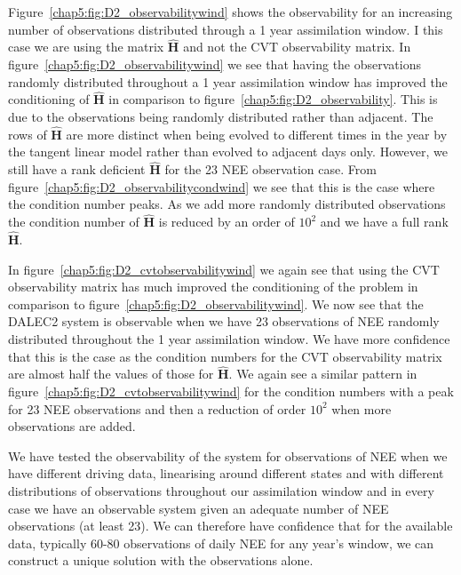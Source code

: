 Figure~\ref{chap5:fig:D2_observabilitywind} shows the observability for an increasing number of observations distributed through a 1 year assimilation window. I this case we are using the matrix $\hat{\textbf{H}}$ and not the CVT observability matrix. In figure~\ref{chap5:fig:D2_observabilitywind} we see that having the observations randomly distributed throughout a 1 year assimilation window has improved the conditioning of $\hat{\textbf{H}}$ in comparison to figure~\ref{chap5:fig:D2_observability}. This is due to the observations being randomly distributed rather than adjacent. The rows of $\hat{\textbf{H}}$ are more distinct when being evolved to different times in the year by the tangent linear model rather than evolved to adjacent days only. However, we still have a rank deficient $\hat{\textbf{H}}$ for the 23 NEE observation case. From figure~\ref{chap5:fig:D2_observabilitycondwind} we see that this is the case where the condition number peaks. As we add more randomly distributed observations the condition number of $\hat{\textbf{H}}$ is reduced by an order of $10^{2}$ and we have a full rank $\hat{\textbf{H}}$. 

In figure~\ref{chap5:fig:D2_cvtobservabilitywind} we again see that using the CVT observability matrix has much improved the conditioning of the problem in comparison to figure~\ref{chap5:fig:D2_observabilitywind}. We now see that the DALEC2 system is observable when we have 23 observations of NEE randomly distributed throughout the 1 year assimilation window. We have more confidence that this is the case as the condition numbers for the CVT observability matrix are almost half the values of those for $\hat{\textbf{H}}$. We again see a similar pattern in figure~\ref{chap5:fig:D2_cvtobservabilitywind} for the condition numbers with a peak for 23 NEE observations and then a reduction of order $10^{2}$ when more observations are added. 

We have tested the observability of the system for observations of NEE when we have different driving data, linearising around different states and with different distributions of observations throughout our assimilation window and in every case we have an observable system given an adequate number of NEE observations (at least 23). We can therefore have confidence that for the available data, typically 60-80 observations of daily NEE for any year's window, we can construct a unique solution with the observations alone.

